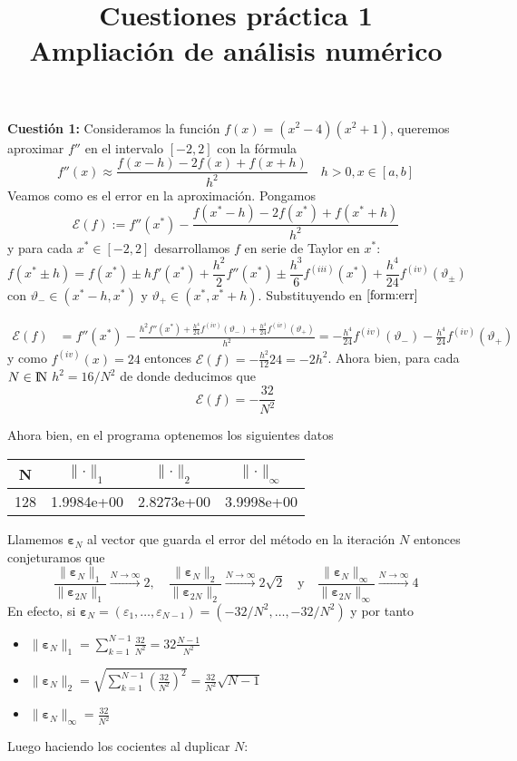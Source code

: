\documentclass[12pt]{article}
\title{\textbf{Cuestiones práctica 1\\ {\small Ampliación de análisis numérico}}}
\date{}
\newcommand{\NN}{{\rm I\!N}}
\newcommand{\norm}[1]{\lVert #1\rVert}
\theoremstyle{definition}
\begin{document}
\maketitle
\noindent 
\textbf{Cuestión 1:} Consideramos la función $f(x) = (x^2 - 4)(x^2 + 1)$, queremos aproximar $f''$ en el intervalo $[-2,2]$ con la fórmula 
$$f''(x) \approx \frac{f(x - h) -2 f(x) + f(x + h)}{h^2} \quad h>0, x\in [a,b]$$
Veamos como es el error en la aproximación. Pongamos
\begin{equation}\tag{$\ast$}\label{form:err}
	\mathcal{E}(f) := f''(x^*) - \frac{f(x^* - h) -2 f(x^*) + f(x^* + h)}{h^2}
\end{equation}
y para cada $x^*\in [-2, 2]$ desarrollamos $f$ en serie de Taylor en $x^*$:
$$f(x^* \pm h) = f(x^*) \pm h f'(x^*) + \frac{h^2}{2}f''(x^*) \pm \frac{h^3}{6}f^{(iii)}(x^*) + \frac{h^4}{24}f^{(iv)}(\vartheta_\pm)$$
con $\vartheta_- \in (x^* - h, x^*)$ y $\vartheta_+ \in (x^*, x^* + h)$. Substituyendo en $\eqref{form:err}$

\begin{align*}
	\mathcal{E}(f) &= f''(x^*) - \frac{h^2f''(x^*) + \frac{h^4}{24}f^{(iv)}(\vartheta_-) + \frac{h^4}{24}f^{(iv)}(\vartheta_+)}{h^2} = -\frac{h^4}{24}f^{(iv)}(\vartheta_-) - \frac{h^4}{24}f^{(iv)}(\vartheta_+)
\end{align*}
y como $f^{(iv)}(x)=24$ entonces $\mathcal{E}(f) = -\frac{h^2}{12}24 = -2h^2$. Ahora bien, para cada $N\in\NN$ $h^2 = 16 /N^2$ de donde deducimos que 
$$\boxed{\mathcal{E}(f) = -\frac{32}{N^2}}$$

\noindent Ahora bien, en el programa optenemos los siguientes datos
\begin{center}
	\begin{tabular}{ ||c | c | c | c ||}
		\hline
		N & $\norm{\cdot}_1$ & $\norm{\cdot}_2$ & $\norm{\cdot}_\infty$ \\
		\hline\hline
		128 & 1.9984e+00 & 2.8273e+00 & 3.9998e+00 \\
		\hline
	\end{tabular}
\end{center}
Llamemos $\bm{\varepsilon}_N$ al vector que guarda el error del método en la iteración $N$ entonces conjeturamos que 
$$\frac{\norm{\bm{\varepsilon}_N}_1}{\norm{\bm{\varepsilon}_{2N}}_1} \stackrel{N\to\infty}{\longrightarrow} 2, \quad \frac{\norm{\bm{\varepsilon}_N}_2}{\norm{\bm{\varepsilon}_{2N}}_2} \stackrel{N\to\infty}{\longrightarrow} 2 \sqrt{2}\quad \text{y}\quad \frac{\norm{\bm{\varepsilon}_N}_\infty}{\norm{\bm{\varepsilon}_{2N}}_\infty} \stackrel{N\to\infty}{\longrightarrow}4$$
En efecto, si $\bm{\varepsilon}_N = (\varepsilon_1, \dots, \varepsilon_{N-1}) = (-32/N^2, \dots, -32/N^2)$ y por tanto
\begin{itemize}
	\item $\displaystyle \norm{\bm{\varepsilon}_N}_1 = \sum_{k=1}^{N-1}\frac{32}{N^2} = 32 \frac{N-1}{N^2}$
	\item $\displaystyle \norm{\bm{\varepsilon}_N}_2 = \sqrt{\sum_{k=1}^{N-1}\left(\frac{32}{N^2}\right)^2} = \frac{32}{N^2} \sqrt{N-1}$
	\item $\displaystyle \norm{\bm{\varepsilon}_N}_\infty = \frac{32}{N^2}$
\end{itemize}
Luego haciendo los cocientes al duplicar $N$:
\end{document}
